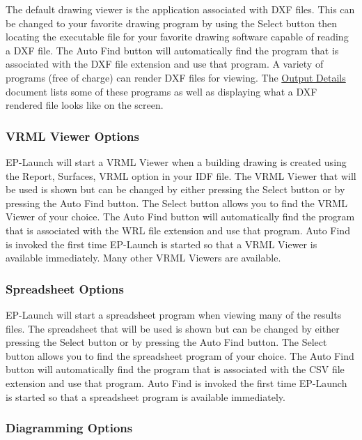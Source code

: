 The default drawing viewer is the application associated with DXF files. This can be changed to your favorite drawing program by using the Select button then locating the executable file for your favorite drawing software capable of reading a DXF file. The Auto Find button will automatically find the program that is associated with the DXF file extension and use that program. A variety of programs (free of charge) can render DXF files for viewing. The \href{OutputDetailsAndExamples.pdf}{Output Details} document lists some of these programs as well as displaying what a DXF rendered file looks like on the screen.

\subsubsection{VRML Viewer Options}\label{vrml-viewer-options}

EP-Launch will start a VRML Viewer when a building drawing is created using the Report, Surfaces, VRML option in your IDF file. The VRML Viewer that will be used is shown but can be changed by either pressing the Select button or by pressing the Auto Find button. The Select button allows you to find the VRML Viewer of your choice. The Auto Find button will automatically find the program that is associated with the WRL file extension and use that program. Auto Find is invoked the first time EP-Launch is started so that a VRML Viewer is available immediately. Many other VRML Viewers are available.

\subsubsection{Spreadsheet Options}\label{spreadsheet-options}

EP-Launch will start a spreadsheet program when viewing many of the results files. The spreadsheet that will be used is shown but can be changed by either pressing the Select button or by pressing the Auto Find button. The Select button allows you to find the spreadsheet program of your choice. The Auto Find button will automatically find the program that is associated with the CSV file extension and use that program. Auto Find is invoked the first time EP-Launch is started so that a spreadsheet program is available immediately.

\subsubsection{Diagramming Options}\label{diagramming-options}

